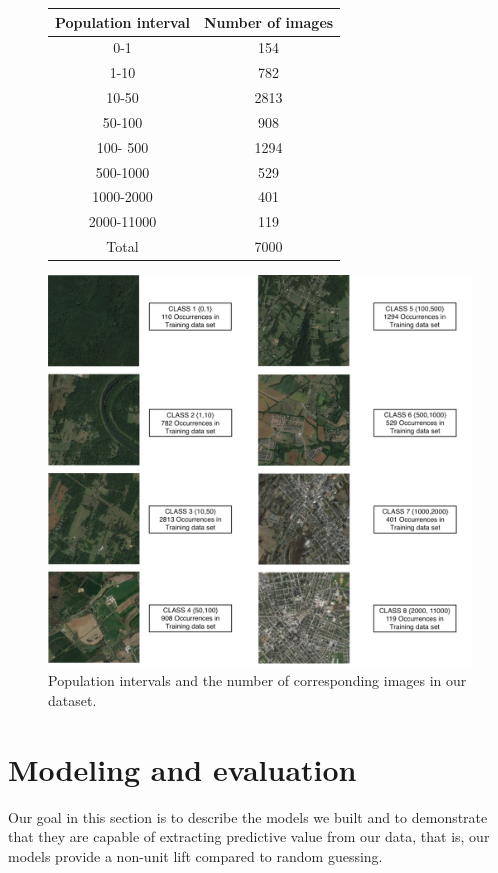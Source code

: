 \documentclass{article}
\begin{document}
\begin{figure}[ht]
\center
\begin{tabular}{ |c|c| } 
\hline
Population interval & Number of images\\
\hline
0-1& 154\\ 
1-10& 782\\ 
10-50& 2813\\
50-100& 908\\
100- 500& 1294\\
500-1000& 529\\
1000-2000& 401\\
2000-11000& 119\\
Total& 7000\\
\hline
\end{tabular}\vspace{0.5cm}
\centering
\includegraphics[scale=0.5]{samples.png}
\caption{Population intervals and the number of corresponding images in our dataset.}
\end{figure}\newpage


\section{Modeling and evaluation}
Our goal in this section is to describe the models we built and to demonstrate that they are capable of extracting predictive value from our data, that is, our models provide a non-unit lift compared to random guessing.
\end{document}

